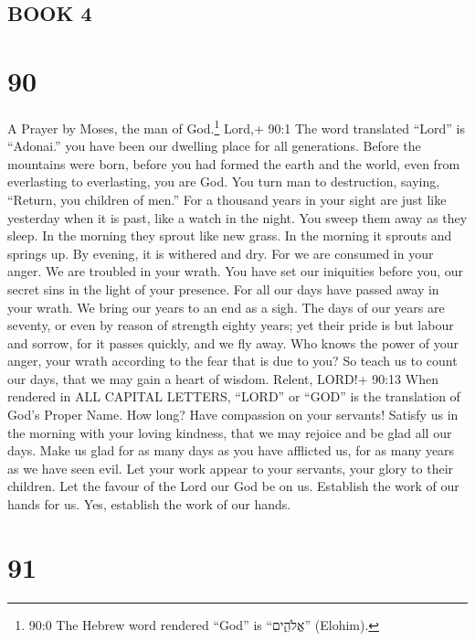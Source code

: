 \hypertarget{book-4}{%
\subsection{BOOK 4}\label{book-4}}

\hypertarget{section-82}{%
\section{90}\label{section-82}}

A Prayer by Moses, the man of God.\footnote{90:0 The Hebrew word
  rendered ``God'' is ``אֱלֹהִ֑ים'' (Elohim).}  Lord,+ 90:1
The word translated ``Lord'' is ``Adonai.'' you have been our dwelling
place for all generations.  Before the mountains were born,
before you had formed the earth and the world, even from everlasting to
everlasting, you are God.  You turn man to destruction,
saying, ``Return, you children of men.''  For a thousand
years in your sight are just like yesterday when it is past, like a
watch in the night.  You sweep them away as they sleep. In
the morning they sprout like new grass.  In the morning it
sprouts and springs up. By evening, it is withered and dry. 
For we are consumed in your anger. We are troubled in your wrath.
 You have set our iniquities before you, our secret sins in
the light of your presence.  For all our days have passed
away in your wrath. We bring our years to an end as a sigh.
 The days of our years are seventy, or even by reason of
strength eighty years; yet their pride is but labour and sorrow, for it
passes quickly, and we fly away.  Who knows the power of
your anger, your wrath according to the fear that is due to you?
 So teach us to count our days, that we may gain a heart of
wisdom.  Relent, LORD!+ 90:13 When rendered in ALL CAPITAL
LETTERS, ``LORD'' or ``GOD'' is the translation of God's Proper Name.
How long? Have compassion on your servants!  Satisfy us in
the morning with your loving kindness, that we may rejoice and be glad
all our days.  Make us glad for as many days as you have
afflicted us, for as many years as we have seen evil.  Let
your work appear to your servants, your glory to their children.
 Let the favour of the Lord our God be on us. Establish the
work of our hands for us. Yes, establish the work of our hands.

\hypertarget{section-83}{%
\section{91}\label{section-83}}

